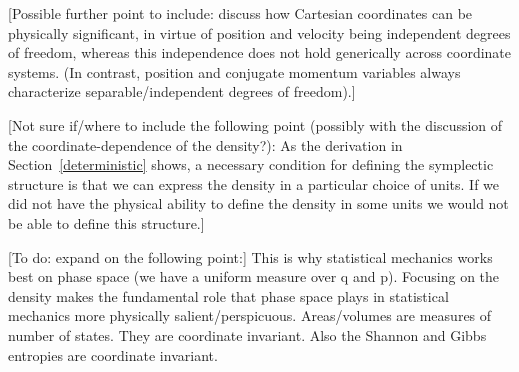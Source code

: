 \documentclass[letterpaper]{article}
\begin{document}
[Possible further point to include: discuss how Cartesian coordinates can be physically significant, in virtue of position and velocity being independent degrees of freedom, whereas this independence does not hold generically across coordinate systems. (In contrast, position and conjugate momentum variables always characterize separable/independent degrees of freedom).]

[Not sure if/where to include the following point (possibly with the discussion of the coordinate-dependence of the density?): As the derivation in Section~\ref{deterministic} shows, a necessary condition for defining the symplectic structure is that we can express the density in a particular choice of units. If we did not have the physical ability to define the density in some units we would not be able to define this structure.]

[To do: expand on the following point:] This is why statistical mechanics works best on phase space (we have a uniform measure over q and p). Focusing on the density makes the fundamental role that phase space plays in statistical mechanics more physically salient/perspicuous. Areas/volumes are measures of number of states. They are coordinate invariant. Also the Shannon and Gibbs entropies are coordinate invariant. 




\end{document}
